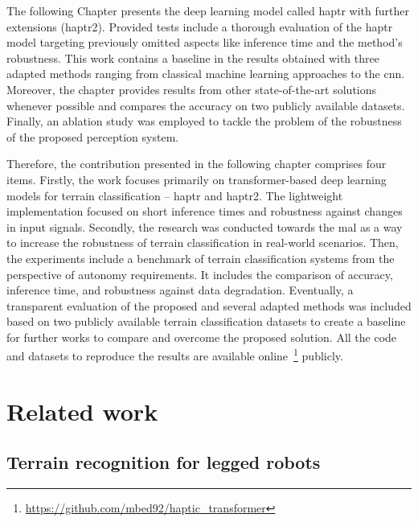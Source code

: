 \documentclass[a4paper, 10pt, twoside]{report}
\begin{document}
The following Chapter presents the deep learning model called \acrshort{haptr} with further extensions (\acrshort{haptr}2). Provided tests include a thorough evaluation of the \acrshort{haptr} model targeting previously omitted aspects like inference time and the method's robustness. This work contains a baseline in the results obtained with three adapted methods ranging from classical machine learning approaches to the \acrshort{cnn}. Moreover, the chapter provides results from other state-of-the-art solutions whenever possible and compares the accuracy on two publicly available datasets. Finally, an ablation study was employed to tackle the problem of the robustness of the proposed perception system. 

Therefore, the contribution presented in the following chapter comprises four items. Firstly, the work focuses primarily on transformer-based deep learning models for terrain classification -- \acrshort{haptr} and \acrshort{haptr}2. The lightweight implementation focused on short inference times and robustness against changes in input signals. Secondly, the research was conducted towards the \acrshort{mal} as a way to increase the robustness of terrain classification in real-world scenarios. Then, the experiments include a benchmark of terrain classification systems from the perspective of autonomy requirements. It includes the comparison of accuracy, inference time, and robustness against data degradation. Eventually, a transparent evaluation of the proposed and several adapted methods was included based on two publicly available terrain classification datasets to create a baseline for further works to compare and overcome the proposed solution.  All the code and datasets to reproduce the results are available online~\footnote{\url{https://github.com/mbed92/haptic_transformer}} publicly.

\section{Related work}
\label{part:methods:terrain:rw}

\subsection{Terrain recognition for legged robots}
\end{document}
